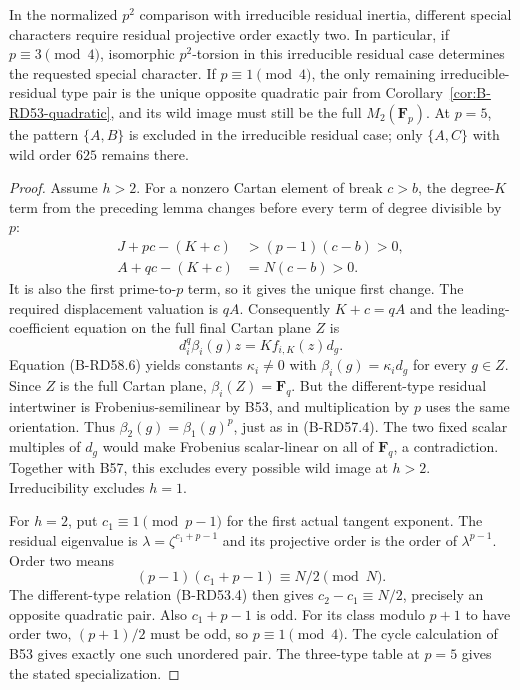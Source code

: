 \begin{theorem}
\label{thm:B-RD58}
In the normalized $p^2$ comparison with irreducible residual
inertia, different special characters require residual projective
order exactly two. In particular, if $p\equiv3\pmod4$, isomorphic
$p^2$-torsion in this irreducible residual case determines the
requested special character. If $p\equiv1\pmod4$, the only
remaining irreducible-residual type pair is the unique opposite
quadratic pair from Corollary~\ref{cor:B-RD53-quadratic}, and its
wild image must still be the full $M_2(\mathbf F_p)$.
At $p=5$, the pattern $\{A,B\}$ is excluded in the irreducible
residual case; only $\{A,C\}$ with wild order $625$ remains there.
\end{theorem}
\begin{proof}
Assume $h>2$. For a nonzero Cartan element of break $c>b$, the
degree-$K$ term from the preceding lemma changes before every
term of degree divisible by $p$:
\[
 \begin{split}
 J+pc-(K+c)&>(p-1)(c-b)>0,\\
 A+qc-(K+c)&=N(c-b)>0.
 \end{split}                                             \tag{B-RD58.7}
\]
It is also the first prime-to-$p$ term, so it gives the unique
first change. The required displacement valuation is $qA$.
Consequently $K+c=qA$ and the leading-coefficient equation on
the full final Cartan plane $Z$ is
\[
                   d_i^q\beta_i(g)z=K f_{i,K}(z)d_g.
                                                               \tag{B-RD58.8}
\]
Equation (B-RD58.6) yields constants $\kappa_i\ne0$ with
$\beta_i(g)=\kappa_i d_g$ for every $g\in Z$.
Since $Z$ is the full Cartan plane, $\beta_i(Z)=\mathbf F_q$.
But the different-type residual intertwiner is Frobenius-semilinear
by B53, and multiplication by $p$ uses the same orientation.
Thus $\beta_2(g)=\beta_1(g)^p$, just as in (B-RD57.4).
The two fixed scalar multiples of $d_g$ would make Frobenius
scalar-linear on all of $\mathbf F_q$, a contradiction.
Together with B57, this excludes every possible wild image at
$h>2$. Irreducibility excludes $h=1$.

For $h=2$, put $c_1\equiv1\pmod{p-1}$ for the first actual
tangent exponent. The residual eigenvalue is
$\lambda=\zeta^{c_1+p-1}$ and its projective order is the order
of $\lambda^{p-1}$. Order two means
\[
              (p-1)(c_1+p-1)\equiv N/2\pmod N.
\]
The different-type relation (B-RD53.4) then gives
$c_2-c_1\equiv N/2$, precisely an opposite quadratic pair.
Also $c_1+p-1$ is odd. For its class modulo $p+1$ to have
order two, $(p+1)/2$ must be odd, so $p\equiv1\pmod4$.
The cycle calculation of B53 gives exactly one such unordered
pair. The three-type table at $p=5$ gives the stated specialization.
\end{proof}

